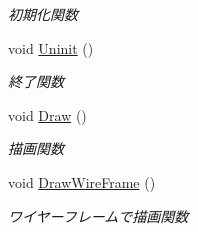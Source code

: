 \begin{DoxyCompactItemize}
\begin{DoxyCompactList}\small\item\em 初期化関数 \end{DoxyCompactList}\item 
void \mbox{\hyperlink{class_mesh_plane_polygon_a05ece33c0296716631bd576b17f07817}{Uninit}} ()
\begin{DoxyCompactList}\small\item\em 終了関数 \end{DoxyCompactList}\item 
void \mbox{\hyperlink{class_mesh_plane_polygon_a813d5d6897ec0ce2b672cd6e1360e281}{Draw}} ()
\begin{DoxyCompactList}\small\item\em 描画関数 \end{DoxyCompactList}\item 
void \mbox{\hyperlink{class_mesh_plane_polygon_a9e932c0b166ef6458405f4514081d227}{Draw\+Wire\+Frame}} ()
\begin{DoxyCompactList}\small\item\em ワイヤーフレームで描画関数 \end{DoxyCompactList}\end{DoxyCompactItemize}
